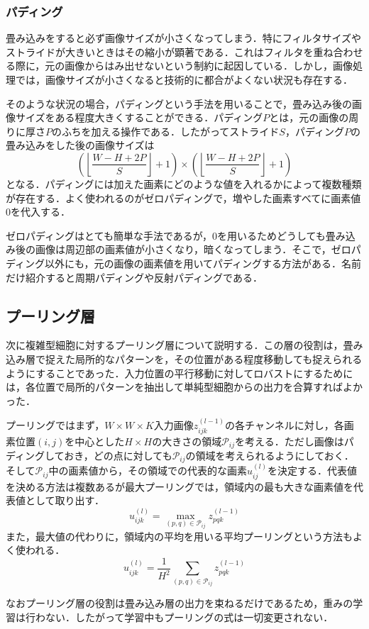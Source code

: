 \documentclass[a4paper,11pt]{jsreport}
\begin{document}
\subsubsection{パディング}
畳み込みをすると必ず画像サイズが小さくなってしまう．特にフィルタサイズやストライドが大きいときはその縮小が顕著である．これはフィルタを重ね合わせる際に，元の画像からはみ出せないという制約に起因している．しかし，画像処理では，画像サイズが小さくなると技術的に都合がよくない状況も存在する．\par
そのような状況の場合，パディングという手法を用いることで，畳み込み後の画像サイズをある程度大きくすることができる．パディング$P$とは，元の画像の周りに厚さ$P$のふちを加える操作である．したがってストライド$S$，パディング$P$の畳み込みをした後の画像サイズは
\begin{equation}
  \left(\left\lfloor \frac{W-H+2P}{S} \right\rfloor + 1\right) \times \left(\left\lfloor \frac{W-H+2P}{S} \right\rfloor + 1\right)
\end{equation}
となる．パディングには加えた画素にどのような値を入れるかによって複数種類が存在する．よく使われるのがゼロパディングで，増やした画素すべてに画素値0を代入する．\par
ゼロパディングはとても簡単な手法であるが，0を用いるためどうしても畳み込み後の画像は周辺部の画素値が小さくなり，暗くなってしまう．そこで，ゼロパディング以外にも，元の画像の画素値を用いてパディングする方法がある．名前だけ紹介すると周期パディングや反射パディングである．

\subsection{プーリング層}
次に複雑型細胞に対するプーリング層について説明する．この層の役割は，畳み込み層で捉えた局所的なパターンを，その位置がある程度移動しても捉えられるようにすることであった．入力位置の平行移動に対してロバストにするためには，各位置で局所的パターンを抽出して単純型細胞からの出力を合算すればよかった．\par
プーリングではまず，$W \times W \times K$入力画像$z_{ijk}^{(l-1)}$の各チャンネルに対し，各画素位置$(i,j)$を中心とした$H \times H$の大きさの領域$\mathcal{P}_{ij}$を考える．ただし画像はパディングしておき，どの点に対しても$\mathcal{P}_{ij}$の領域を考えられるようにしておく．そして$\mathcal{P}_{ij}$中の画素値から，その領域での代表的な画素$u_{ij}^{(l)}$を決定する．代表値を決める方法は複数あるが最大プーリングでは，領域内の最も大きな画素値を代表値として取り出す．
\begin{equation}
  u_{ijk}^{(l)}
  = \underset{(p,q) \in \mathcal{P}_{ij}} {\operatorname{max}} z_{pqk}^{(l-1)} 
\end{equation}
また，最大値の代わりに，領域内の平均を用いる平均プーリングという方法もよく使われる．
\begin{equation}
  u_{ijk}^{(l)}
  = \frac{1}{H^2} \sum_{(p,q) \in \mathcal{P}_{ij}} z_{pqk}^{(l-1)} 
\end{equation}\par
なおプーリング層の役割は畳み込み層の出力を束ねるだけであるため，重みの学習は行わない．したがって学習中もプーリングの式は一切変更されない．
\end{document}
